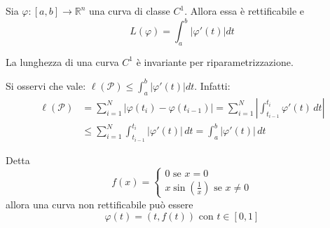 \begin{theorem}
Sia $\varphi: [a,b] \to \mathbb{R}^n$ una curva di classe $C^1$. Allora essa è rettificabile e 
\begin{equation*}
    L(\varphi)=\int_{a}^{b}{|\varphi'(t)|dt}
\end{equation*}
\end{theorem}
\begin{oss}
    La lunghezza di una curva $C^1$ è invariante per riparametrizzazione.
\end{oss}
\begin{oss}
    Si osservi che vale: $\ell(\mathcal{P})\leq \int_{a}^{b}{|\varphi'(t)|dt}$. Infatti:
    \begin{equation*}
        \begin{aligned}
            \ell(\mathcal{P}) &= \sum\limits_{i=1}^{N} \left| \varphi(t_i) - \varphi(t_{i-1}) \right|= \sum\limits_{i=1}^{N} \left\lvert \int_{t_{i-1}}^{t_i} \varphi'(t) \, dt \right\rvert \\
            &\leq \sum\limits_{i=1}^{N} \int_{t_{i-1}}^{t_i} \left\lvert \varphi'(t) \right\rvert \, dt = \int_{a}^{b} \left\lvert \varphi'(t) \right\rvert \, dt
        \end{aligned}
    \end{equation*}
\end{oss}
\begin{example}
    Detta 
    \begin{equation*}
        f(x)= \begin{cases}
            0 \text{ se } x=0\\ x\sin\left(\frac{1}{x}\right) \text{ se } x\neq 0
        \end{cases}
    \end{equation*}
    allora una curva non rettificabile può essere 
    \begin{equation*}
        \varphi(t)=(t, f(t)) \text{ con } t\in[0,1]
    \end{equation*}
\end{example}

